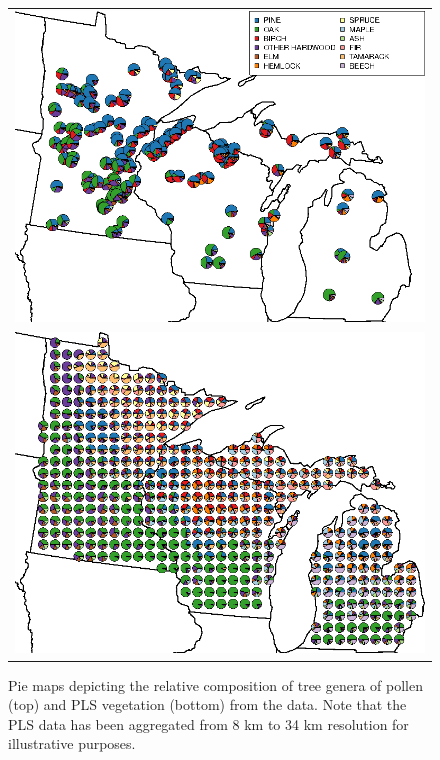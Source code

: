 \begin{figure}
\centering
\begin{tabular}{c}
\includegraphics[width=5in]{figures/pie_plot_pollen_ALL_v0_3.png} \\
\includegraphics[width=5in]{figures/pie_plot_pls_ALL_v0_3.png}
\end{tabular}
\caption{Pie maps depicting the relative composition of tree genera of pollen (top)
  and PLS vegetation (bottom) from the data. Note that the PLS data
  has been aggregated from 8 km to 34 km resolution for illustrative
  purposes.}
\label{fig:pie}
\end{figure}

